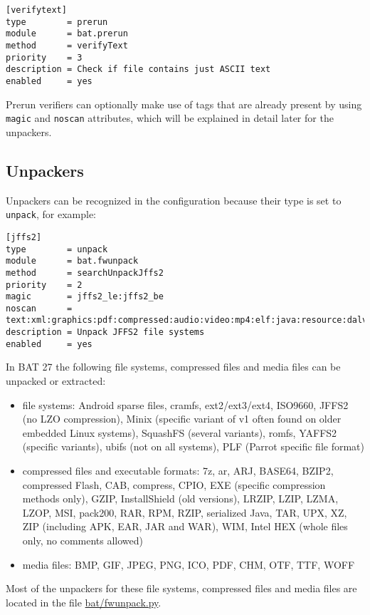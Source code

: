 \documentclass[10pt,a4paper]{article}
\begin{document}
\begin{verbatim}
[verifytext]
type        = prerun
module      = bat.prerun
method      = verifyText
priority    = 3
description = Check if file contains just ASCII text
enabled     = yes
\end{verbatim}

Prerun verifiers can optionally make use of tags that are already present by
using \texttt{magic} and \texttt{noscan} attributes, which will be explained
in detail later for the unpackers.

\subsection{Unpackers}

Unpackers can be recognized in the configuration because their type is set
to \texttt{unpack}, for example:

\begin{verbatim}
[jffs2]
type        = unpack
module      = bat.fwunpack
method      = searchUnpackJffs2
priority    = 2
magic       = jffs2_le:jffs2_be
noscan      = text:xml:graphics:pdf:compressed:audio:video:mp4:elf:java:resource:dalvik
description = Unpack JFFS2 file systems
enabled     = yes
\end{verbatim}

In BAT 27 the following file systems, compressed files and media files can be
unpacked or extracted:

\begin{itemize}
\item file systems: Android sparse files, cramfs, ext2/ext3/ext4, ISO9660,
JFFS2 (no LZO compression), Minix (specific variant of v1 often found on older
embedded Linux systems), SquashFS (several variants), romfs, YAFFS2 (specific
variants), ubifs (not on all systems), PLF (Parrot specific file format)
\item compressed files and executable formats: 7z, ar, ARJ, BASE64, BZIP2,
compressed Flash, CAB, compress, CPIO, EXE (specific compression methods only),
GZIP, InstallShield (old versions), LRZIP, LZIP, LZMA, LZOP, MSI, pack200, RAR,
RPM, RZIP, serialized Java, TAR, UPX, XZ, ZIP (including APK, EAR, JAR and
WAR), WIM, Intel HEX (whole files only, no comments allowed)
\item media files: BMP, GIF, JPEG, PNG, ICO, PDF, CHM, OTF, TTF, WOFF
\end{itemize}

Most of the unpackers for these file systems, compressed files and media files
are located in the file \url{bat/fwunpack.py}.
\end{document}
